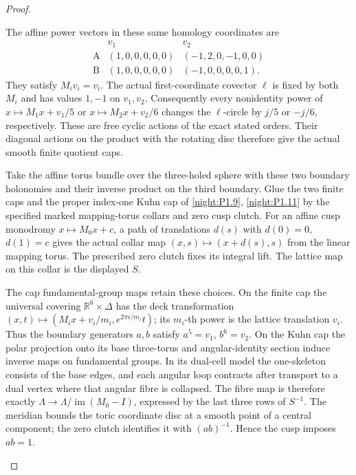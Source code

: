 \begin{proof}
\begin{enumerate}[label=\arabic*.]
The affine power vectors in these same homology coordinates are
\[
\begin{array}{c|cc}
 &v_1&v_2\\\hline
 \mathrm A&(1,0,0,0,0,0)&(-1,2,0,-1,0,0)\\
 \mathrm B&(1,0,0,0,0,0)&(-1,0,0,0,0,1).
\end{array}
\]
They satisfy $M_iv_i=v_i$. The actual first-coordinate covector
$\ell$ is fixed by both $M_i$ and has values $1,-1$ on $v_1,v_2$.
Consequently every nonidentity power of
$x\mapsto M_1x+v_1/5$ or $x\mapsto M_2x+v_2/6$ changes the
$\ell$-circle by $j/5$ or $-j/6$, respectively. These are free
cyclic actions of the exact stated orders. Their diagonal actions
on the product with the rotating disc therefore give the actual
smooth finite quotient caps.

Take the affine torus bundle over the three-holed sphere with these
two boundary holonomies and their inverse product on the third
boundary. Glue the two finite caps and the proper index-one Kuhn
cap of \cref{night:P1.9}, \cref{night:P1.11} by the
specified marked mapping-torus collars and zero cusp clutch.
For an affine cusp monodromy $x\mapsto M_0x+c$, a path of translations
$d(s)$ with $d(0)=0$, $d(1)=c$ gives the actual collar map
$(x,s)\mapsto(x+d(s),s)$ from the linear mapping torus. The prescribed
zero clutch fixes its integral lift. The lattice map on this collar
is the displayed $S$.

The cap fundamental-group maps retain these choices. On the finite
cap the universal covering $\mathbb R^6\times\Delta$ has the deck
transformation
$(x,t)\mapsto(M_ix+v_i/m_i,e^{2\pi i/m_i}t)$; its $m_i$-th power
is the lattice translation $v_i$. Thus the boundary generators
$a,b$ satisfy $a^5=v_1$, $b^6=v_2$. On the Kuhn cap the polar
projection onto its base three-torus and angular-identity section
induce inverse maps on fundamental groups. In its dual-cell model
the one-skeleton consists of the base edges, and each angular loop
contracts after transport to a dual vertex where that angular
fibre is collapsed. The fibre map is therefore exactly
$\Lambda\to\Lambda/\operatorname{im}(M_0-I)$, expressed by the last
three rows of $S^{-1}$. The meridian bounds the toric coordinate
disc at a smooth point of a central component; the zero clutch
identifies it with $(ab)^{-1}$. Hence the cusp imposes $ab=1$.


\end{enumerate}
\end{proof}
